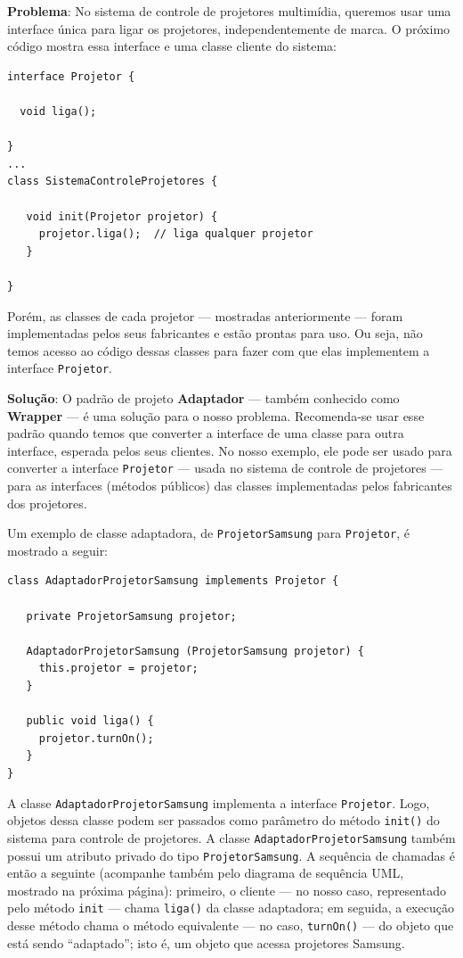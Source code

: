 \documentclass[
  11pt,
  twoside]{book}
\newcommand{\passthrough}[1]{#1}
\begin{document}
\textbf{Problema}: No sistema de controle de projetores multimídia,
queremos usar uma interface única para ligar os projetores,
independentemente de marca. O próximo código mostra essa interface e uma
classe cliente do sistema:

\begin{lstlisting}
interface Projetor {

  void liga();

}
...
class SistemaControleProjetores {

   void init(Projetor projetor) {
     projetor.liga();  // liga qualquer projetor
   }

}
\end{lstlisting}

Porém, as classes de cada projetor --- mostradas anteriormente --- foram
implementadas pelos seus fabricantes e estão prontas para uso. Ou seja,
não temos acesso ao código dessas classes para fazer com que elas
implementem a interface \passthrough{\lstinline!Projetor!}.

 \textbf{Solução}: O padrão de projeto \textbf{Adaptador}
--- também conhecido como \textbf{Wrapper} --- é uma solução para o
nosso problema. Recomenda-se usar esse padrão quando temos que converter
a interface de uma classe para outra interface, esperada pelos seus
clientes. No nosso exemplo, ele pode ser usado para converter a
interface \passthrough{\lstinline!Projetor!} --- usada no sistema de
controle de projetores --- para as interfaces (métodos públicos) das
classes implementadas pelos fabricantes dos projetores.

Um exemplo de classe adaptadora, de
\passthrough{\lstinline!ProjetorSamsung!} para
\passthrough{\lstinline!Projetor!}, é mostrado a seguir:

\begin{lstlisting}
class AdaptadorProjetorSamsung implements Projetor {

   private ProjetorSamsung projetor;

   AdaptadorProjetorSamsung (ProjetorSamsung projetor) {
     this.projetor = projetor;
   }

   public void liga() {
     projetor.turnOn();
   }
}
\end{lstlisting}

A classe \passthrough{\lstinline!AdaptadorProjetorSamsung!} implementa a
interface \passthrough{\lstinline!Projetor!}. Logo, objetos dessa classe
podem ser passados como parâmetro do método
\passthrough{\lstinline!init()!} do sistema para controle de projetores.
A classe \passthrough{\lstinline!AdaptadorProjetorSamsung!} também
possui um atributo privado do tipo
\passthrough{\lstinline!ProjetorSamsung!}. A sequência de chamadas é
então a seguinte (acompanhe também pelo diagrama de sequência UML,
mostrado na próxima página): primeiro, o cliente --- no nosso caso,
representado pelo método \passthrough{\lstinline!init!} --- chama
\passthrough{\lstinline!liga()!} da classe adaptadora; em seguida, a
execução desse método chama o método equivalente --- no caso,
\passthrough{\lstinline!turnOn()!} --- do objeto que está sendo
``adaptado''; isto é, um objeto que acessa projetores Samsung.
\end{document}
